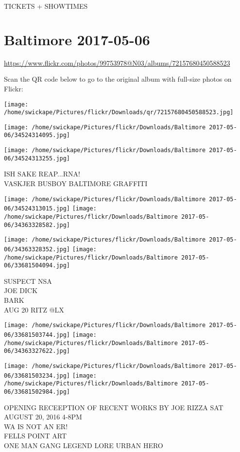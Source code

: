 \documentclass[10pt,letterpaper]{article}
\begin{document}
TICKETS + SHOWTIMES
\pagebreak

\section*{Baltimore 2017-05-06}

\url{https://www.flickr.com/photos/99753978@N03/albums/72157680450588523}

Scan the QR code below to go to the original album with full-size photos on Flickr:

\texttt{[image: /home/swickape/Pictures/flickr/Downloads/qr/72157680450588523.jpg]}
\pagebreak

\texttt{[image: /home/swickape/Pictures/flickr/Downloads/Baltimore 2017-05-06/34524314095.jpg]}

\vspace{0.25in}
\texttt{[image: /home/swickape/Pictures/flickr/Downloads/Baltimore 2017-05-06/34524313255.jpg]}

ISH SAKE REAP...RNA!\\
VASKJER BUSBOY BALTIMORE GRAFFITI
\pagebreak

\texttt{[image: /home/swickape/Pictures/flickr/Downloads/Baltimore 2017-05-06/34524313015.jpg]}
\texttt{[image: /home/swickape/Pictures/flickr/Downloads/Baltimore 2017-05-06/34363328582.jpg]}

\texttt{[image: /home/swickape/Pictures/flickr/Downloads/Baltimore 2017-05-06/34363328352.jpg]}
\texttt{[image: /home/swickape/Pictures/flickr/Downloads/Baltimore 2017-05-06/33681504094.jpg]}

SUSPECT NSA\\
JOE DICK\\
BARK\\
AUG 20 RITZ @LX
\pagebreak

\texttt{[image: /home/swickape/Pictures/flickr/Downloads/Baltimore 2017-05-06/33681503744.jpg]}
\texttt{[image: /home/swickape/Pictures/flickr/Downloads/Baltimore 2017-05-06/34363327622.jpg]}

\texttt{[image: /home/swickape/Pictures/flickr/Downloads/Baltimore 2017-05-06/33681503234.jpg]}
\texttt{[image: /home/swickape/Pictures/flickr/Downloads/Baltimore 2017-05-06/33681502984.jpg]}

OPENING RECEEPTION OF RECENT WORKS BY JOE RIZZA SAT AUGUST 20, 2016 4{-}8PM\\
WA IS NOT AN ER!\\
FELLS POINT ART\\
ONE MAN GANG LEGEND LORE URBAN HERO
\pagebreak
\end{document}
